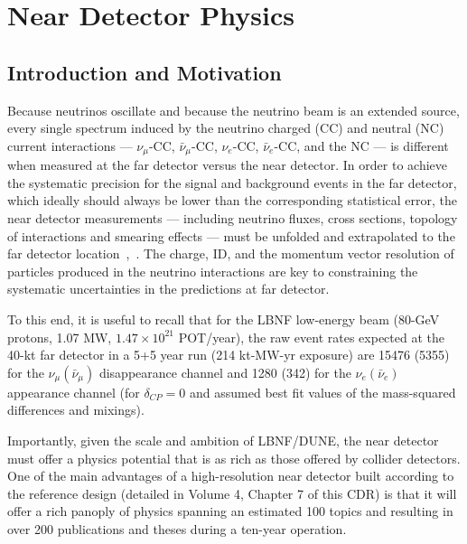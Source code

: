 
\chapter{Near Detector Physics}
\label{ch:physics-nd}

\section{Introduction and Motivation}
\label{sec:physics-nd-introduction}

Because neutrinos oscillate and because the neutrino beam is an extended  source, every single 
spectrum induced by the neutrino charged (CC) and neutral (NC) current interactions --- $\nu_\mu$-CC, 
$\bar \nu_\mu$-CC, $\nu_e$-CC, $\bar \nu_e$-CC, and the NC --- is different when measured at the far detector versus 
the near detector. 
In order to achieve the systematic precision for the signal and background events  in the far detector,  
which ideally should always be lower than the corresponding statistical error, the near detector 
measurements ---  including neutrino fluxes,  cross sections, topology of 
interactions and smearing effects --- must be unfolded and extrapolated to the far detector 
location~\cite{near detector-REQ1},~\cite{near detector-REQ2}.  The charge, ID,  and the momentum vector resolution of 
particles produced in the neutrino interactions are %
key to constraining  the systematic 
uncertainties in the predictions at far detector. 
%

To this end, it is useful to recall that for the LBNF low-energy beam 
(80-GeV protons, 1.07 MW, $1.47 \times 10^{21} $ POT/year), the raw event rates expected at the  
40-kt far detector in a 5+5 year run (214 kt-MW-yr exposure) are 15476 (5355) for 
the $\nu_\mu (\bar \nu_\mu)$ disappearance channel 
and 1280 (342) for the $\nu_e(\bar \nu_e)$ appearance channel (for $\delta_{CP}=0$ and assumed 
best fit values of the mass-squared differences and mixings). 


Importantly, given the scale and ambition of LBNF/DUNE, the near detector must offer a physics 
potential that is as rich as those offered by collider detectors. 
One of the main advantages of a high-resolution near detector built according to the reference design 
(detailed in Volume 4, Chapter 7 of  this CDR) is that it will offer a rich panoply of physics %
spanning an estimated 100 topics and  resulting in over 200 publications and theses during a ten-year operation. 

